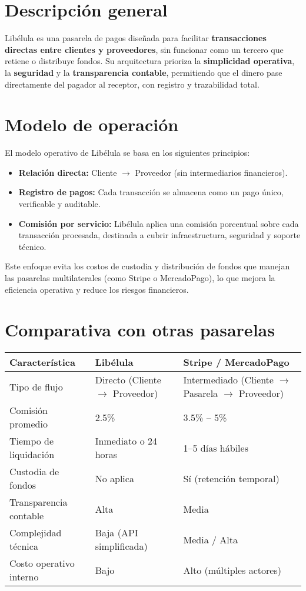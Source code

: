 \section*{Descripción general}
	\noindent
	Libélula es una pasarela de pagos diseñada para facilitar \textbf{transacciones directas entre clientes y proveedores}, sin funcionar como un tercero que retiene o distribuye fondos. Su arquitectura prioriza la \textbf{simplicidad operativa}, la \textbf{seguridad} y la \textbf{transparencia contable}, permitiendo que el dinero pase directamente del pagador al receptor, con registro y trazabilidad total.
	
	\section*{Modelo de operación}
	\noindent
	El modelo operativo de Libélula se basa en los siguientes principios:
	\begin{itemize}
		\item \textbf{Relación directa:} Cliente $\rightarrow$ Proveedor (sin intermediarios financieros).
		\item \textbf{Registro de pagos:} Cada transacción se almacena como un pago único, verificable y auditable.
		\item \textbf{Comisión por servicio:} Libélula aplica una comisión porcentual sobre cada transacción procesada, destinada a cubrir infraestructura, seguridad y soporte técnico.
	\end{itemize}
	
	Este enfoque evita los costos de custodia y distribución de fondos que manejan las pasarelas multilaterales (como Stripe o MercadoPago), lo que mejora la eficiencia operativa y reduce los riesgos financieros.

	\section*{Comparativa con otras pasarelas}
	
	\begin{center}
		\begin{tabular}{>{\raggedright}p{4cm} p{5cm} p{5cm}}
			\toprule
			\textbf{Característica} & \textbf{Libélula} & \textbf{Stripe / MercadoPago} \\
			\midrule
			Tipo de flujo & Directo (Cliente $\rightarrow$ Proveedor) & Intermediado (Cliente $\rightarrow$ Pasarela $\rightarrow$ Proveedor) \\
			Comisión promedio & 2.5\% & 3.5\% -- 5\% \\
			Tiempo de liquidación & Inmediato o 24 horas & 1--5 días hábiles \\
			Custodia de fondos & No aplica & Sí (retención temporal) \\
			Transparencia contable & Alta & Media \\
			Complejidad técnica & Baja (API simplificada) & Media / Alta \\
			Costo operativo interno & Bajo & Alto (múltiples actores) \\
			\bottomrule
		\end{tabular}
	\end{center}
	
